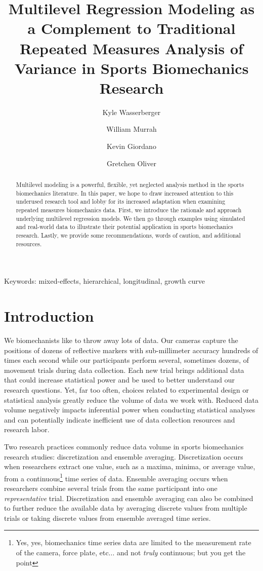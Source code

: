 \documentclass[
]{article}
\author[1]{\footnotesize Kyle Wasserberger}
\author[3]{\footnotesize William Murrah}
\author[4]{\footnotesize Kevin Giordano}
\author[2]{\footnotesize Gretchen Oliver}
\affil[1]{Research \& Development; Driveline Baseball}
\affil[2]{School of Kinesiology; Auburn University}
\affil[3]{\footnotesize Department of Educational Foundations, Leadership, \& Technology; Auburn University}
\affil[4]{\footnotesize Department of Physical Therapy; Creighton University}
\title{Multilevel Regression Modeling as a Complement to Traditional Repeated Measures Analysis of Variance in Sports Biomechanics Research}
\date{\vspace{-2.5em}}
\begin{document}
\maketitle

\begin{center}
Keywords: mixed-effects, hierarchical, longitudinal, growth curve
\end{center}

\newpage
\linenumbers
\begin{abstract}
\doublespacing
Multilevel modeling is a powerful, flexible, yet neglected analysis method in the sports biomechanics literature. In this paper, we hope to draw increased attention to this underused research tool and lobby for its increased adaptation when examining repeated measures biomechanics data. First, we introduce the rationale and approach underlying multilevel regression models. We then go through examples using simulated and real-world data to illustrate their potential application in sports biomechanics research. Lastly, we provide some recommendations, words of caution, and additional resources.
\end{abstract}

\newpage
{}

\hypertarget{introduction}{%
\section{Introduction}\label{introduction}}

\doublespacing

We biomechanists like to throw away lots of data. Our cameras capture the positions of dozens of reflective markers with sub-millimeter accuracy hundreds of times each second while our participants perform several, sometimes dozens, of movement trials during data collection. Each new trial brings additional data that could increase statistical power and be used to better understand our research questions. Yet, far too often, choices related to experimental design or statistical analysis greatly reduce the volume of data we work with. Reduced data volume negatively impacts inferential power when conducting statistical analyses and can potentially indicate inefficient use of data collection resources and research labor.

Two research practices commonly reduce data volume in sports biomechanics research studies: discretization and ensemble averaging. Discretization occurs when researchers extract one value, such as a maxima, minima, or average value, from a continuous\footnote{Yes, yes, biomechanics time series data are limited to the measurement rate of the camera, force plate, etc... and not \textit{truly} continuous; but you get the point} time series of data. Ensemble averaging occurs when researchers combine several trials from the same participant into one \emph{representative} trial. Discretization and ensemble averaging can also be combined to further reduce the available data by averaging discrete values from multiple trials or taking discrete values from ensemble averaged time series.
\end{document}

